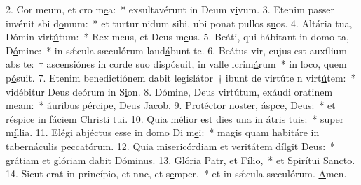 2. Cor meum, et cro m\uline{e}a:~* exsultavérunt in Deum v\uline{i}vum.
3. Etenim passer invénit sbi d\uline{o}mum:~* et turtur nidum sibi, ubi ponat pullos s\uline{u}os.
4. Altária tua, Dómin virt\uline{ú}tum:~* Rex meus, et Deus m\uline{e}us.
5. Beáti, qui hábitant in domo ta, D\uline{ó}mine:~* in sǽcula sæculórum laud\uline{á}bunt te.
6. Beátus vir, cujus est auxílium abs te:~† ascensiónes in corde suo dispósuit, in valle lcrim\uline{á}rum~* in loco, quem p\uline{ó}suit.
7. Etenim benedictiónem dabit legislátor~† ibunt de virtúte n virt\uline{ú}tem:~* vidébitur Deus deórum in S\uline{i}on.
8. Dómine, Deus virtútum, exáudi oratinem m\uline{e}am:~* áuribus pércipe, Deus J\uline{a}cob.
9. Protéctor noster, áspce, D\uline{e}us:~* et réspice in fáciem Christi t\uline{u}i.
10. Quia mélior est dies una in átris t\uline{u}is:~* super m\uline{í}llia.
11. Elégi abjéctus esse in domo Di m\uline{e}i:~* magis quam habitáre in tabernáculis peccat\uline{ó}rum.
12. Quia misericórdiam et veritátem dílgit D\uline{e}us:~* grátiam et glóriam dabit D\uline{ó}minus.
13. Glória Patr, et F\uline{í}lio,~* et Spirítui S\uline{a}ncto.
14. Sicut erat in princípio, et nnc, et s\uline{e}mper,~* et in sǽcula sæculórum. \uline{A}men.
